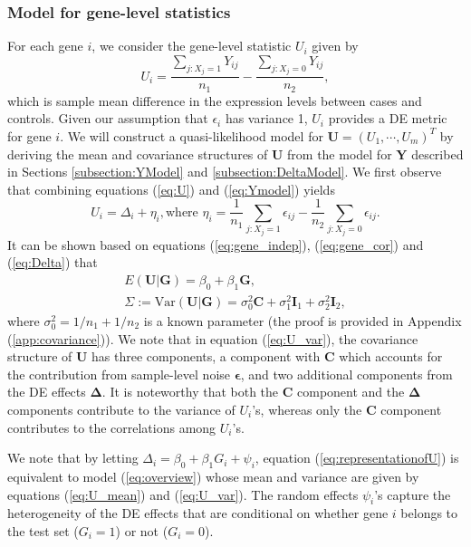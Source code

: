 \documentclass[a4,center,fleqn]{NAR}
\begin{document}
	\subsubsection{Model for gene-level statistics}\label{subsection:UModel}
	For each gene $i$, we consider the gene-level statistic $U_i$ given by 
	\begin{equation}
	\label{eq:U}
	U_i = \dfrac{\sum_{j: X_j=1}Y_{ij}}{n_1} - \dfrac{\sum_{j: X_j=0}Y_{ij}}{n_2},
	\end{equation}
	which is sample mean difference in the expression levels between cases and controls. Given our
	assumption that $\epsilon_i$ has variance 1, $U_i$ provides a DE metric for gene $i$. We will
	construct a quasi-likelihood model for $\bm U=(U_1,\cdots,U_m)^T$ by deriving the mean and
	covariance structures of $\bm U$ from the model for $\bm Y$ described in Sections
	\ref{subsection:YModel} and \ref{subsection:DeltaModel}. We first observe that combining 
	equations (\ref{eq:U}) and (\ref{eq:Ymodel}) yields
	\begin{equation}\label{eq:representationofU}
	U_i = \Delta_i + \eta_i, \text{where } \eta_i = \dfrac{1}{n_1}\sum_{j: X_j=1}\epsilon_{ij}-
	\dfrac{1}{n_2}\sum_{j: X_j=0}\epsilon_{ij}.
	\end{equation}
	It can be shown based on equations (\ref{eq:gene_indep}), (\ref{eq:gene_cor}) and 
	(\ref{eq:Delta}) that
	\begin{gather}
	E(\bm U|\bm G) = \beta_0+\beta_1 \bm G,\label{eq:U_mean}\\
	\Sigma:=\mbox{Var}(\bm U|\bm G) = \sigma_0^2\bm C + \sigma_1^2\bm I_1+\sigma_2^2\bm
	I_2,\label{eq:U_var}
	\end{gather}
	where $\sigma_0^2=1/n_1+1/n_2$ is a known parameter (the proof is provided in Appendix 
	(\ref{app:covariance})). We note that in equation (\ref{eq:U_var}), the	covariance structure of 
	$\bm U$ has three components, a component with $\bm C$ which accounts for the contribution from 
	sample-level noise $\bm \epsilon$, and two additional components from the DE effects $\bm 
	\Delta$. It is noteworthy that both the $\bm C$ component and the $\bm \Delta$ components 
	contribute to the variance of $U_i$'s, whereas only the $\bm C$ component contributes to
	the correlations among $U_i$'s.
	
	We note that by letting $\Delta_i = \beta_0 + \beta_1 G_i + \psi_i$, equation 
	(\ref{eq:representationofU}) is equivalent to model (\ref{eq:overview}) whose mean 
	and variance are given by equations (\ref{eq:U_mean}) and (\ref{eq:U_var}). The random effects 
	$\psi_i$'s capture the heterogeneity of the DE effects that are conditional on whether gene $i$ 
	belongs to the test set ($G_i=1$) or not ($G_i= 0$).
\end{document}
